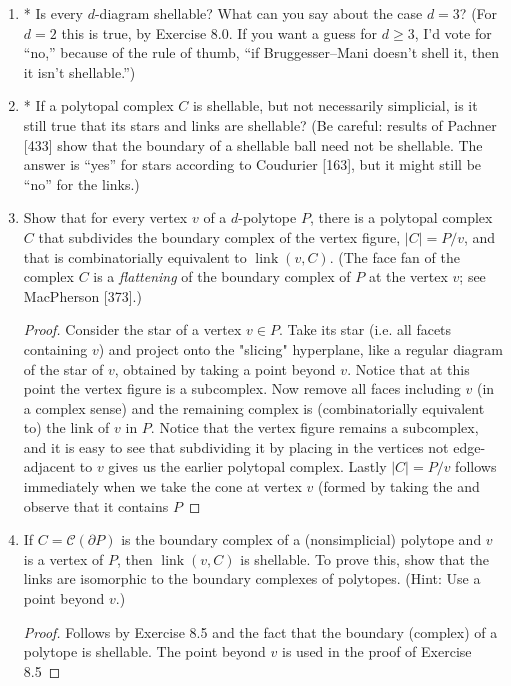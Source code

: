 \documentclass{article}
\begin{document}
\begin{enumerate}
\item * Is every $d$-diagram shellable? What can you say about the case $d=3$?
(For $d=2$ this is true, by Exercise 8.0. If you want a guess for $d \ge 3$, I'd vote for ``no,'' because of the rule of thumb, ``if Bruggesser--Mani doesn't shell it, then it isn't shellable.'')

\item * If a polytopal complex $C$ is shellable, but not necessarily simplicial, is it still true that its stars and links are shellable?
(Be careful: results of Pachner [433] show that the boundary of a shellable ball need not be shellable. The answer is ``yes'' for stars according to Coudurier [163], but it might still be ``no'' for the links.)

\item Show that for every vertex $v$ of a $d$-polytope $P$, there is a polytopal complex $C$ that subdivides the boundary complex of the vertex figure, $|C|=P/v$, and that is combinatorially equivalent to $\operatorname{link}(v,C)$.
(The face fan of the complex $C$ is a \emph{flattening} of the boundary complex of $P$ at the vertex $v$; see MacPherson [373].)

\begin{proof}
    Consider the star of a vertex $v \in P$. Take its star (i.e. all facets containing $v$) and project onto the "slicing" hyperplane, like a regular diagram of the star of $v$, obtained by taking a point beyond $v$. Notice that at this point the vertex figure is a subcomplex. Now remove all faces including $v$ (in a complex sense) and the remaining complex is (combinatorially equivalent to) the link of $v$ in $P$. Notice that the vertex figure remains a subcomplex, and it is easy to see that subdividing it by placing in the vertices not edge-adjacent to $v$ gives us the earlier polytopal complex. Lastly $|C| = P/v$ follows immediately when we take the cone at vertex $v$ (formed by taking the  and observe that it contains $P$ 
\end{proof}

\item If $C=\mathcal{C}(\partial P)$ is the boundary complex of a (nonsimplicial) polytope and $v$ is a vertex of $P$, then $\operatorname{link}(v,C)$ is shellable. To prove this, show that the links are isomorphic to the boundary complexes of polytopes.
(Hint: Use a point beyond $v$.)

\begin{proof}
    Follows by Exercise 8.5 and the fact that the boundary (complex) of a polytope is shellable. The point beyond $v$ is used in the proof of Exercise 8.5
\end{proof}


\end{enumerate}
\end{document}

